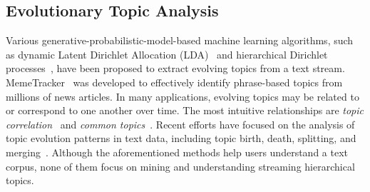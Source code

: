 \subsection{Evolutionary Topic Analysis}
Various generative-probabilistic-model-based machine learning algorithms, such as dynamic Latent Dirichlet Allocation (LDA)~\cite{blei2006} and hierarchical Dirichlet processes~\cite{Ahmed2008,Ahmed2010,Xu2008a,Zhang2010}, have been proposed to extract evolving topics from a text stream.
MemeTracker~\cite{Leskovec2009} was developed to effectively identify phrase-based topics from millions of news articles.
In many applications, evolving topics may be related to or correspond to one another over time.
The most intuitive relationships are \emph{\normalsize topic correlation}~\cite{wang2007} and \emph{\normalsize common topics}~\cite{wang2009}.
Recent efforts have focused on the analysis of topic evolution patterns in text data, including topic birth, death, splitting, and merging~\cite{Gao2011}.
Although the aforementioned methods help users understand a text corpus, none of them focus on mining and understanding streaming hierarchical topics.

